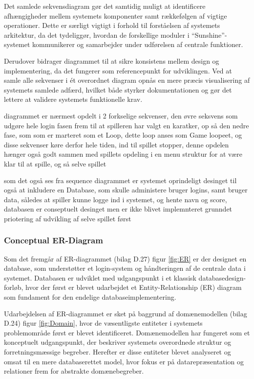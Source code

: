 Det samlede sekvensdiagram gør det samtidig muligt at identificere afhængigheder mellem systemets komponenter samt rækkefølgen af vigtige operationer. Dette er særligt vigtigt i forhold til forståelsen af systemets arkitektur, da det tydeliggør, hvordan de forskellige moduler i “Sunshine”-systemet kommunikerer og samarbejder under udførelsen af centrale funktioner.

Derudover bidrager diagrammet til at sikre konsistens mellem design og implementering, da det fungerer som referencepunkt for udviklingen. Ved at samle alle sekvenser i ét overordnet diagram opnås en mere præcis visualisering af systemets samlede adfærd, hvilket både styrker dokumentationen og gør det lettere at validere systemets funktionelle krav.

diagrammet er nærmest opdelt i 2 forkselige sekvenser, den øvre seksvens som udgøre hele login fasen frem til at spilleren har valgt en karatker, op så den nedre fase, som som er marteret som et Loop, dette loop anses som Game loopeet, og disse sekvenser køre derfor hele tiden, ind til spillet stopper, denne opdelen hænger også godt sammen med spillets opdeling i en menu struktur for at være klar til at spille, og så selve spillet

som det også ses fra sequence diagrammet er systemet oprindeligt desinget til også at inkludere en Database, som skulle administere bruger logins, samt bruger data, således at spiller kunne logge ind i systemet, og hente navn og score, databasen er conseptuelt desinget men er ikke blivet implemnteret grunndet priotering af udvikling af selve spillet først

\subsubsection{Conceptual ER-Diagram}
Som det fremgår af ER-diagrammet (bilag D.27) figur \ref{fig:ER} er der designet en database, som understøtter et login-system og håndteringen af de centrale data i systemet. Databasen er udviklet med udgangspunkt i et klassisk databasedesign-forløb, hvor der først er blevet udarbejdet et Entity-Relationship (ER) diagram som fundament for den endelige databaseimplementering.

Udarbejdelsen af ER-diagrammet er sket på baggrund af domænemodellen (bilag D.24) figur \ref{fig:Domain}, hvor de væsentligste entiteter i systemets problemområde først er blevet identificeret. Domænemodellen har fungeret som et konceptuelt udgangspunkt, der beskriver systemets overordnede struktur og forretningsmæssige begreber. Herefter er disse entiteter blevet analyseret og omsat til en mere databaserettet model, hvor fokus er på datarepræsentation og relationer frem for abstrakte domænebegreber.


